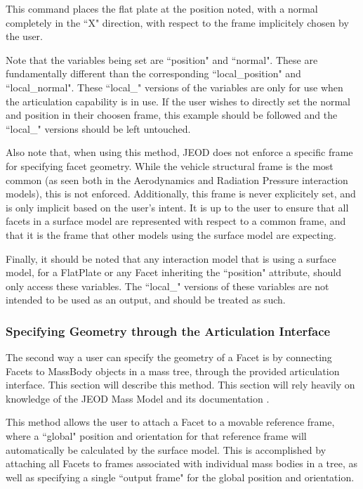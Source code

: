 This command places the flat plate at the position noted,
with a normal completely in the ``X" direction, with respect to
the frame implicitely chosen by the user.

Note that the variables being set are ``position" and ``normal".
These are fundamentally different than the corresponding 
``local\_position" and ``local\_normal". These ``local\_" versions
of the variables are only for use when the articulation
capability is in use. If the user wishes
to directly set the normal and position in their choosen frame,
this example should be followed and the ``local\_" versions
should be left untouched.

Also note that, when using this method, JEOD does not enforce a specific
frame for specifying facet geometry. While the vehicle structural frame
is the most common (as seen both in the Aerodynamics \cite{dynenv:AERODYNAMICS}
and Radiation Pressure \cite{dynenv:RADIATIONPRESSURE} interaction
models), this is not enforced. Additionally, this frame
is never explicitely set, and is only implicit based on the
user's intent. It is up to the user to
ensure that all facets in a surface model are represented with respect
to a common frame, and that it is the frame that other models
using the surface model are expecting.

Finally, it should be noted that any interaction model that is using a surface
model, for a FlatPlate or any Facet inheriting the ``position" attribute,
should only access these variables. The ``local\_" versions of these variables
are not intended to be used as an output, and should be treated as such.

\subsubsection{Specifying Geometry through the Articulation Interface}

The second way a user can specify the geometry of a Facet is
by connecting Facets to MassBody objects in a mass tree, through
the provided articulation interface. This section will describe
this method. This section will rely heavily on knowledge of the JEOD
Mass Model and its documentation \cite{dynenv:MASS}.

This method allows the user to attach a Facet to a movable reference frame, where a ``global"
position and orientation for that reference frame will automatically be calculated by the surface
model. This is accomplished by attaching all Facets to frames associated with individual
mass bodies in a tree, as well as specifying a single ``output frame" for the global
position and orientation.

